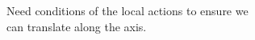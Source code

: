\documentclass[preview]{standalone}
\begin{document}
Need conditions of the local actions to ensure we \\ can translate along the axis.\\
\end{document}
